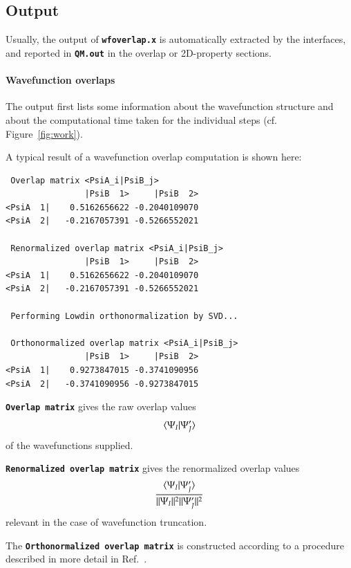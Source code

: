 \documentclass[a4paper,10pt,DIV=15,openany,twoside=false]{scrbook}
\newcommand{\ttt}[1]{\textbf{\texttt{#1}}}
\newenvironment{example}{
  \setlength{\OuterFrameSep}{3pt}
  \vspace{0mm}
  \definecolor{shadecolor}{HTML}{E4F4FF}
  \begin{shaded}
}{
  \end{shaded}
}
\begin{document}
\subsection{Output}

Usually, the output of \ttt{wfoverlap.x} is automatically extracted by the interfaces, and reported in \ttt{QM.out} in the overlap or 2D-property sections.

\paragraph{Wavefunction overlaps}

The output first lists some information about the wavefunction structure and about the computational time taken for the individual steps (cf. Figure~\ref{fig:work}).

A typical result of a wavefunction overlap computation is shown here:
\begin{example}
\begin{verbatim}
 Overlap matrix <PsiA_i|PsiB_j>
                |PsiB  1>     |PsiB  2>
<PsiA  1|    0.5162656622 -0.2040109070
<PsiA  2|   -0.2167057391 -0.5266552021

 Renormalized overlap matrix <PsiA_i|PsiB_j>
                |PsiB  1>     |PsiB  2>
<PsiA  1|    0.5162656622 -0.2040109070
<PsiA  2|   -0.2167057391 -0.5266552021

 Performing Lowdin orthonormalization by SVD...

 Orthonormalized overlap matrix <PsiA_i|PsiB_j>
                |PsiB  1>     |PsiB  2>
<PsiA  1|    0.9273847015 -0.3741090956
<PsiA  2|   -0.3741090956 -0.9273847015
\end{verbatim}
\end{example}

\ttt{Overlap matrix} gives the raw overlap values
\begin{equation}
  \braket{\Psi_I|\Psi_J'}
\end{equation}
of the wavefunctions supplied.

\ttt{Renormalized overlap matrix} gives the renormalized overlap values
\begin{equation}
  \frac{  \braket{\Psi_I|\Psi_J'}  }{  ||\Psi_I||^2  ||\Psi_J'||^2}
\end{equation}
relevant in the case of wavefunction truncation.

The \ttt{Orthonormalized overlap matrix} is constructed according to a procedure described in more detail in Ref.~\cite{Plasser2016JCTC}.
\end{document}
